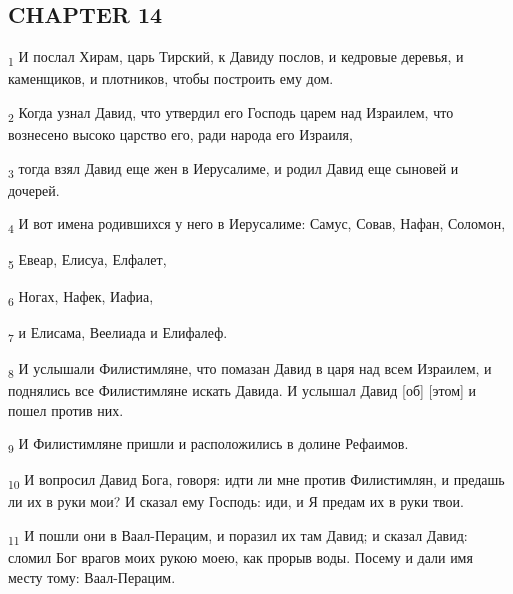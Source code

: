 \subsection{CHAPTER 14}
\begin{tcolorbox}
\textsubscript{1} И послал Хирам, царь Тирский, к Давиду послов, и кедровые деревья, и каменщиков, и плотников, чтобы построить ему дом.
\end{tcolorbox}
\begin{tcolorbox}
\textsubscript{2} Когда узнал Давид, что утвердил его Господь царем над Израилем, что вознесено высоко царство его, ради народа его Израиля,
\end{tcolorbox}
\begin{tcolorbox}
\textsubscript{3} тогда взял Давид еще жен в Иерусалиме, и родил Давид еще сыновей и дочерей.
\end{tcolorbox}
\begin{tcolorbox}
\textsubscript{4} И вот имена родившихся у него в Иерусалиме: Самус, Совав, Нафан, Соломон,
\end{tcolorbox}
\begin{tcolorbox}
\textsubscript{5} Евеар, Елисуа, Елфалет,
\end{tcolorbox}
\begin{tcolorbox}
\textsubscript{6} Ногах, Нафек, Иафиа,
\end{tcolorbox}
\begin{tcolorbox}
\textsubscript{7} и Елисама, Веелиада и Елифалеф.
\end{tcolorbox}
\begin{tcolorbox}
\textsubscript{8} И услышали Филистимляне, что помазан Давид в царя над всем Израилем, и поднялись все Филистимляне искать Давида. И услышал Давид [об] [этом] и пошел против них.
\end{tcolorbox}
\begin{tcolorbox}
\textsubscript{9} И Филистимляне пришли и расположились в долине Рефаимов.
\end{tcolorbox}
\begin{tcolorbox}
\textsubscript{10} И вопросил Давид Бога, говоря: идти ли мне против Филистимлян, и предашь ли их в руки мои? И сказал ему Господь: иди, и Я предам их в руки твои.
\end{tcolorbox}
\begin{tcolorbox}
\textsubscript{11} И пошли они в Ваал-Перацим, и поразил их там Давид; и сказал Давид: сломил Бог врагов моих рукою моею, как прорыв воды. Посему и дали имя месту тому: Ваал-Перацим.
\end{tcolorbox}
